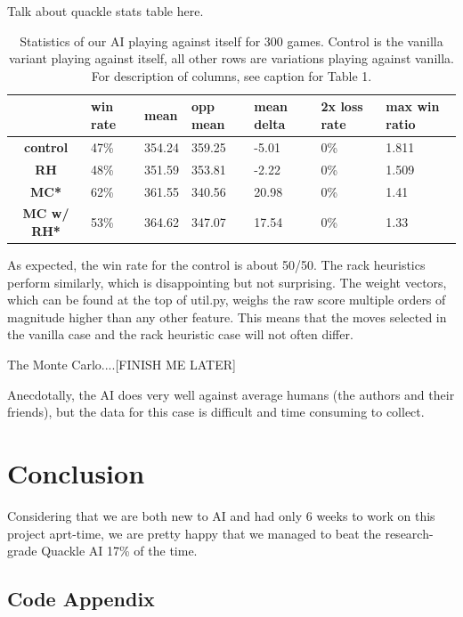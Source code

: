 \documentclass[12pt]{article}
\begin{document}
Talk about quackle stats table here.

\begin{table}[h!]
  \centering
  \begin{tabular}{c|l|l|l|l|l|l}
    \textbf{} & \textbf{win rate} & \textbf{mean} & \textbf{opp mean} & \textbf{mean delta} &  \textbf{2x loss rate} & \textbf{max win ratio} \\\hline
  \textbf{control}   & 47\% & 354.24 & 359.25 & -5.01  & 0\%  & 1.811\\
  \textbf{RH}        & 48\% & 351.59 & 353.81 & -2.22  & 0\%  & 1.509\\
  \textbf{MC*}       & 62\% & 361.55 & 340.56 & 20.98  & 0\%  & 1.41 \\
  \textbf{MC w/ RH*} & 53\% & 364.62 & 347.07 & 17.54  & 0\%  & 1.33 \\
\end{tabular}
  \caption{Statistics of our AI playing against itself for 300
    games. Control is the vanilla variant playing against itself, all
    other rows are variations playing against vanilla. For description
    of columns, see caption for Table 1.}
\end{table}

As expected, the win rate for the control is about 50/50. The rack
heuristics perform similarly, which is disappointing but not
surprising. The weight vectors, which can be found at the top of
util.py, weighs the raw score multiple orders of magnitude higher than
any other feature. This means that the moves selected in the vanilla
case and the rack heuristic case will not often differ.

The Monte Carlo....[FINISH ME LATER]

Anecdotally, the AI does very well against average humans (the authors and their friends), but the data for this case is difficult and time consuming to collect.

\section*{Conclusion}
Considering that we are both new to AI and had only 6 weeks to work on this project aprt-time, we are pretty happy that we managed to beat the research-grade Quackle AI 17\% of the time.

\clearpage
\begin{center}
 \section*{Code Appendix}
\end{center}
\end{document}
